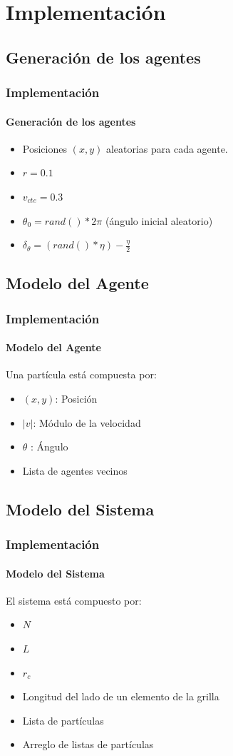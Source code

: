 \documentclass[hyperref={pdfpagelayout=SinglePage}]{beamer}
\begin{document}
\section{Implementación}

\subsection{Generación de los agentes}

\begin{frame}
\frametitle{Implementación}
\framesubtitle{Generación de los agentes}
\begin{itemize}
	\item Posiciones $(x,y)$ aleatorias para cada agente.
	\item $r = 0.1$
	\item $v_{cte} = 0.3$
	\item $\theta_{0} = rand() * 2\pi$ (ángulo inicial aleatorio)
	\item $\delta_{\theta} = {(rand() * \eta) - \frac{\eta}{2}} $
\end{itemize}
\end{frame}

\subsection{Modelo del Agente}

\begin{frame}
\frametitle{Implementación}
\framesubtitle{Modelo del Agente}
Una partícula está compuesta por:
\begin{itemize}
	\item $(x,y)$: Posición 
	\item $|v|$: Módulo de la velocidad
	\item $\theta$ : Ángulo
	\item Lista de agentes vecinos
\end{itemize}
\end{frame}

\subsection{Modelo del Sistema}

\begin{frame}
\frametitle{Implementación}
\framesubtitle{Modelo del Sistema}
El sistema está compuesto por:
\begin{itemize}
	\item $N$ 
	\item $L$
	\item $r_{c}$
	\item Longitud del lado de un elemento de la grilla
	\item Lista de partículas
	\item Arreglo de listas de partículas
\end{itemize}
\end{frame}
\end{document}
